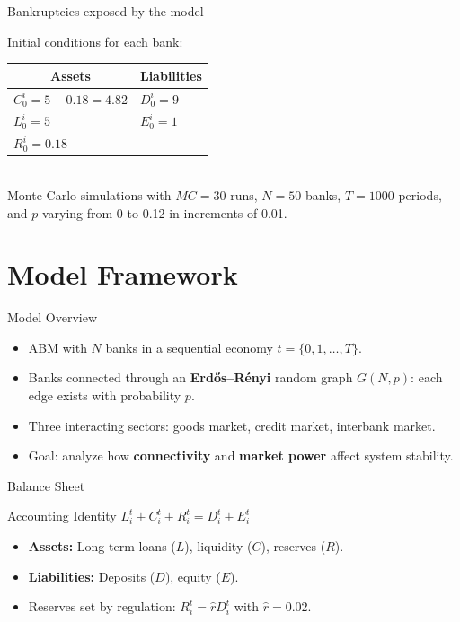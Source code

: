 \begin{frame}{Bankruptcies exposed by the model}
  {\tiny
  Initial conditions for each bank:
  \begin{tabular}{l|l}
    \multicolumn{1}{c|}{\textbf{Assets}} & \multicolumn{1}{c}{\textbf{Liabilities}} \\ \hline
    $C^i_0= 5-0.18 = 4.82$ & $D^i_0= 9$\\
    $L^i_0= 5$ & $E^i_0= 1$ \\
    $R^i_0 = 0.18$ &
  \end{tabular} \\
  Monte Carlo simulations with $\mathit{MC} = 30$ runs, $N=50$ banks, $T=1000$ periods, and $p$ varying from 0 to 0.12 in increments of 0.01.
  }
\end{frame}



\section{Model Framework}\label{sec:3}

\begin{frame}{Model Overview}
  \begin{itemize}
    \item ABM with $N$ banks in a sequential economy $t = \{0, 1, \dots, T\}$.
    \item Banks connected through an \textbf{Erd\H{o}s--R\'enyi} random graph $G(N, p)$: each edge exists with probability $p$.
    \item Three interacting sectors: goods market, credit market, interbank market.
    \item Goal: analyze how \textbf{connectivity} and \textbf{market power} affect system stability.
  \end{itemize}
\end{frame}

\begin{frame}{Balance Sheet}
  \begin{block}{Accounting Identity}
    $L_i^t + C_i^t + R_i^t = D_i^t + E_i^t$
  \end{block}
  \begin{itemize}
    \item \textbf{Assets:} Long-term loans ($L$), liquidity ($C$), reserves ($R$).
    \item \textbf{Liabilities:} Deposits ($D$), equity ($E$).
    \item Reserves set by regulation: $R_i^t = \hat{r} D_i^t$ with $\hat{r} = 0.02$.
  \end{itemize}
\end{frame}

